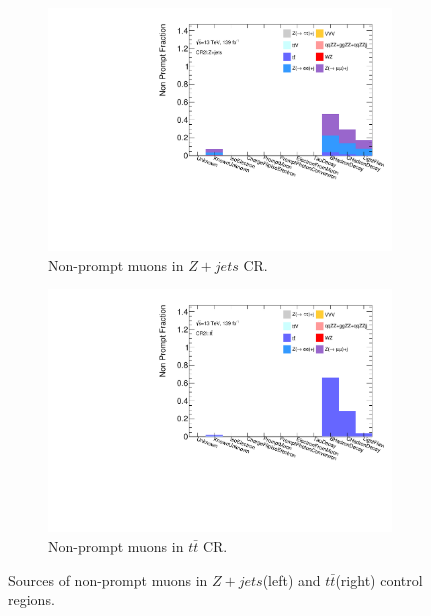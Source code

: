 \begin{figure}[!htb]
    \begin{subfigure}{.48\textwidth}
        \centering
        \includegraphics[width=.9\linewidth]{figures/Analysis/Background/NonPromptComposition_ZplusX_Muon.pdf}
        \caption{Non-prompt muons in $Z+jets$ CR.}
    \end{subfigure}
    \begin{subfigure}{.48\textwidth}
        \centering
        \includegraphics[width=.9\linewidth]{figures/Analysis/Background/NonPromptComposition_ttbar_Muons.pdf}
        \caption{Non-prompt muons in $t\bar{t}$ CR.}
    \end{subfigure}
        \caption{ Sources of non-prompt muons in $Z+jets$(left) and $t\bar{t}$(right) control regions.\label{fig:FakeCompositionCR2LMuon}}
\end{figure}

